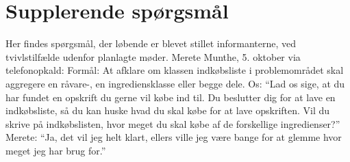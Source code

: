 \section{Supplerende spørgsmål}

Her findes spørgsmål, der løbende er blevet stillet informanterne, ved tvivlstilfælde udenfor planlagte møder.
Merete Munthe, 5. oktober via telefonopkald:
Formål: At afklare om klassen indkøbsliste i problemområdet skal aggregere en råvare-, en ingrediensklasse eller begge dele.
Os: ``Lad os sige, at du har fundet en opskrift du gerne vil købe ind til. Du beslutter dig for at lave en indkøbsliste, så du kan huske hvad du skal købe for at lave opskriften. Vil du skrive på indkøbslisten, hvor meget du skal købe af de forskellige ingredienser?''
Merete: ``Ja, det vil jeg helt klart, ellers ville jeg være bange for at glemme hvor meget jeg har brug for.''